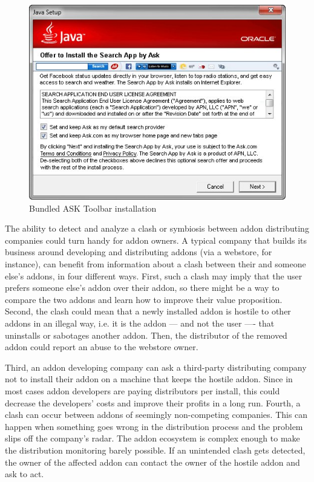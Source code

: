 \documentclass[11pt,oneside]{book}
\begin{document}
\begin{figure}[h]
\centering
\includegraphics[scale=.8,angle=0]{figures/ask_offer.png}
\caption{Bundled ASK Toolbar installation}
\label{fig:ask_offer}
\end{figure} 

The ability to detect and analyze a clash or symbiosis between addon distributing companies could turn handy for addon owners. 
A typical company that builds its business around developing and distributing addons (via a webstore, for instance), can benefit from information about a clash between their and someone else's addons, in four different ways.
First, such a clash may imply that the user prefers someone else's addon over their addon, so there might be a way to compare the two addons and  learn how to improve their value proposition. 
Second, the clash could mean that a newly installed addon is hostile to other addons in an illegal way, i.e. it is the addon --- and not the user ---- that uninstalls or sabotages another addon. Then, the distributor of the removed addon could report an abuse to the webstore owner.

Third, an addon developing company can ask a third-party distributing company not to install their addon on a machine that keeps the hostile addon. Since in most cases addon developers are paying distributors per install, this could decrease the developers' costs and improve their profits in a long run.
Fourth, a clash can occur between addons of seemingly non-competing companies. This can happen when something goes wrong in the distribution process and the problem slips off the company's radar. The addon ecosystem is complex enough to make the distribution monitoring barely possible. If an unintended clash gets detected, the owner of the affected addon can contact the owner of the hostile addon and ask to act.
\end{document}
